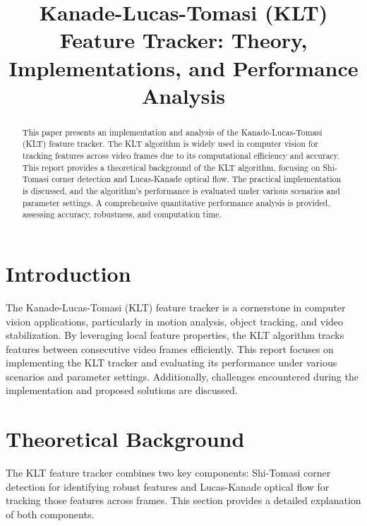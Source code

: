\documentclass[11pt, conference, letterpaper]{IEEEtran}
\begin{document}
\title{Kanade-Lucas-Tomasi (KLT) Feature Tracker: Theory, Implementations, and Performance Analysis}

\author{
}

\maketitle

\thispagestyle{plain}  %
\pagestyle{plain} 

\begin{abstract}
This paper presents an implementation and analysis of the Kanade-Lucas-Tomasi (KLT) feature tracker. The KLT algorithm is widely used in computer vision for tracking features across video frames due to its computational efficiency and accuracy. This report provides a theoretical background of the KLT algorithm, focusing on Shi-Tomasi corner detection and Lucas-Kanade optical flow. The practical implementation is discussed, and the algorithm's performance is evaluated under various scenarios and parameter settings. A comprehensive quantitative performance analysis is provided, assessing accuracy, robustness, and computation time.
\end{abstract}

\section{Introduction}
The Kanade-Lucas-Tomasi (KLT) feature tracker is a cornerstone in computer vision applications, particularly in motion analysis, object tracking, and video stabilization. By leveraging local feature properties, the KLT algorithm tracks features between consecutive video frames efficiently. This report focuses on implementing the KLT tracker and evaluating its performance under various scenarios and parameter settings. Additionally, challenges encountered during the implementation and proposed solutions are discussed.

\section{Theoretical Background}
The KLT feature tracker combines two key components: Shi-Tomasi corner detection for identifying robust features and Lucas-Kanade optical flow for tracking those features across frames. This section provides a detailed explanation of both components.
\end{document}
